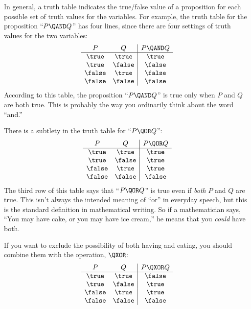 In general, a truth table indicates the true/false value of a proposition
for each possible set of truth values for the variables.  For example, the
truth table for the proposition ``$P \QAND Q$'' has four lines, since
there are four settings of truth values for the two variables:
%
\[
\begin{array}{cc|c}
P & Q & P \QAND Q \\ \hline
\true & \true & \true \\
\true & \false & \false \\
\false & \true & \false \\
\false & \false & \false
\end{array}
\]
%
According to this table, the proposition ``$P \QAND Q$'' is true only when
$P$ and $Q$ are both true.  This is probably the way you ordinarily think
about the word ``and.''

There is a subtlety in the truth table for ``$P \QOR Q$'':
%
\[
\begin{array}{cc|c}
P & Q & P \QOR Q \\ \hline
\true & \true & \true \\
\true & \false & \true \\
\false & \true & \true \\
\false & \false & \false
\end{array}
\]
%
The third row of this table says that ``$P \QOR Q$'' is true even if
\textit{both} $P$ and $Q$ are true.  This isn't always the intended
meaning of ``or'' in everyday speech, but this is the standard definition
in mathematical writing.  So if a mathematician says, ``You may have cake,
or you may have ice cream,'' he means that you \textit{could} have both.

If you want to exclude the possibility of both having and eating, you
should combine them with the  operation, $\QXOR$:
%
\[\begin{array}{cc|c}
P & Q & P \QXOR Q \\ \hline
\true & \true & \false \\
\true & \false & \true \\
\false & \true & \true \\
\false & \false & \false
\end{array}
\]

\subsection{\QIMPLIES}


